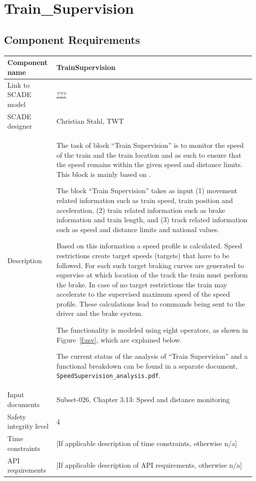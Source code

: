 
\section{Train\_Supervision}

\subsection{Component Requirements}

\begin{longtable}{p{}p{}}
\toprule
Component name			& TrainSupervision \\
\midrule
Link to SCADE model		& {\footnotesize \url{???}} \\
\midrule
SCADE designer			& Christian Stahl, TWT \\
\midrule
Description				& The task of block ``Train Supervision'' is to monitor the speed of the train and the train location and as such to ensure that the speed remains within the given speed and distance limits. This block is mainly based on \cite[Chapt.~3.13]{subset-026}.

The block ``Train Supervision'' takes as input (1) movement related information such as train speed, train position and acceleration, (2) train related information such as brake information and train length, and (3) track related information such as speed and distance limits and national values.

Based on this information a speed profile is calculated. Speed restrictions create target speeds (targets) that have to be followed. For each such target braking curves are generated to supervise at which location of the track the train must perform the brake. In case of no target restrictions the train may accelerate to the supervised maximum speed of the speed profile. These calculations lead to commands being sent to the driver and the brake system.

The functionality is modeled using eight operators, as shown in Figure~\ref{f:ssv}, which are explained below.

The current status of the analysis of ``Train Supervision'' and a functional breakdown can be found in a separate document, \verb+SpeedSupervision_analysis.pdf+.\\
\midrule
Input documents	& 
Subset-026, Chapter 3.13: Speed and distance monitoring \\
\midrule
Safety integrity level		& 4 \\
\midrule
Time constraints		& [If applicable description of time constraints, otherwise n/a] \\
\midrule
API requirements 		& [If applicable description of API requirements, otherwise n/a] \\
\bottomrule
\end{longtable}


